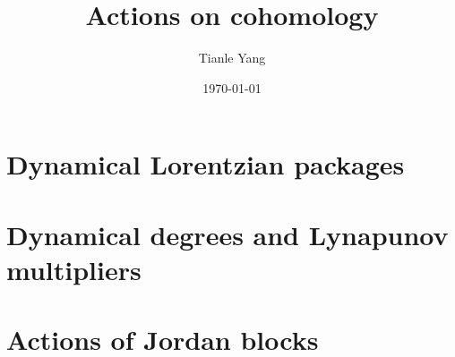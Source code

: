 \documentclass[sectionlevel=chapter,status=draft]{noteformyself}
\title{Actions on cohomology}
\author{Tianle Yang}
\date{\today}
\begin{document}
    \maketitle

    \tableofcontents

    \section[
      status=draft,
      tag=00000,
      label=\labelNFM{sec:actions-on-cohomology:dynamical-lorentzian-packages}
    ]{Dynamical Lorentzian packages}
    
    \section[
      status=draft,
      tag=00000,
      label=\labelNFM{sec:actions-on-cohomology:dynamical-degrees-and-lynapunov-multipliers}
    ]{Dynamical degrees and Lynapunov multipliers}
    
    \section[
      status=draft,
      tag=00000,
      label=\labelNFM{sec:actions-on-cohomology:actions-of-jordan-blocks}
    ]{Actions of Jordan blocks}
    

    \printbibliography[heading=bibintoc, title={References}]
\end{document}
